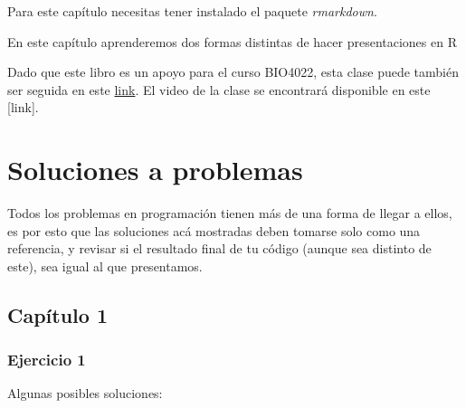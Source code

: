 \documentclass[]{book}
\newenvironment{Shaded}{\begin{snugshade}}{\end{snugshade}}
\newcommand{\KeywordTok}[1]{\textcolor[rgb]{0.13,0.29,0.53}{\textbf{#1}}}
\newcommand{\NormalTok}[1]{#1}
\newcommand{\OperatorTok}[1]{\textcolor[rgb]{0.81,0.36,0.00}{\textbf{#1}}}
\newcommand{\StringTok}[1]{\textcolor[rgb]{0.31,0.60,0.02}{#1}}
\begin{document}
Para este capítulo necesitas tener instalado el paquete
\emph{rmarkdown}.

En este capítulo aprenderemos dos formas distintas de hacer
presentaciones en R

Dado que este libro es un apoyo para el curso BIO4022, esta clase puede
también ser seguida en este
\href{https://derek-corcoran-barrios.github.io/Clase6/Clase6Loopsybibliografia}{link}.
El video de la clase se encontrará disponible en este {[}link{]}.

\hypertarget{soluciones}{%
\chapter{Soluciones a problemas}\label{soluciones}}

Todos los problemas en programación tienen más de una forma de llegar a
ellos, es por esto que las soluciones acá mostradas deben tomarse solo
como una referencia, y revisar si el resultado final de tu código
(aunque sea distinto de este), sea igual al que presentamos.

\hypertarget{capitulo-1}{%
\section{Capítulo 1}\label{capitulo-1}}

\hypertarget{ejercicio-1-3}{%
\subsection{Ejercicio 1}\label{ejercicio-1-3}}

Algunas posibles soluciones:

\begin{Shaded}
\end{Shaded}

\begin{Shaded}
\end{Shaded}
\end{document}

